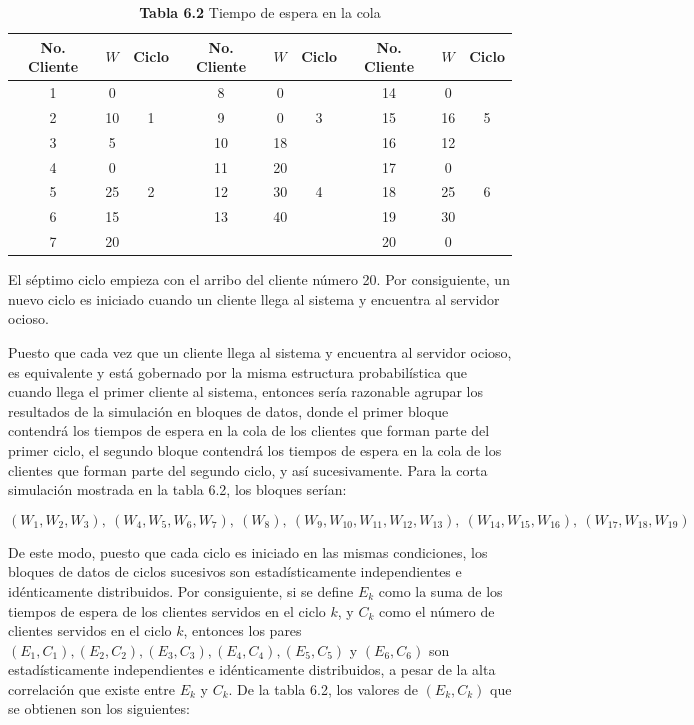 \documentclass[11pt,letterpaper]{report}
\begin{document}
\begin{table}[H]
\centering
\caption*{\textbf{Tabla 6.2} Tiempo de espera en la cola}
\begin{tabular}{ccc ccc ccc}
\toprule
No. Cliente & $W$ & Ciclo & No. Cliente & $W$ & Ciclo & No. Cliente & $W$ & Ciclo \\
\midrule
1 & 0 & & 8 & 0 & & 14 & 0 & \\
2 & 10 & 1 & 9 & 0 & 3 & 15 & 16 & 5 \\
3 & 5 & & 10 & 18 & & 16 & 12 & \\
4 & 0 & & 11 & 20 & & 17 & 0 & \\
5 & 25 & 2 & 12 & 30 & 4 & 18 & 25 & 6 \\
6 & 15 & & 13 & 40 & & 19 & 30 & \\
7 & 20 & & & & & 20 & 0 & \\
\bottomrule
\end{tabular}
\end{table}

El séptimo ciclo empieza con el arribo del cliente número 20. Por
consiguiente, un nuevo ciclo es iniciado cuando un cliente llega al
sistema y encuentra al servidor ocioso.

Puesto que cada vez que un cliente llega al sistema y encuentra al
servidor ocioso, es equivalente y está gobernado por la misma estructura
probabilística que cuando llega el primer cliente al sistema, entonces
sería razonable agrupar los resultados de la simulación en bloques de
datos, donde el primer bloque contendrá los tiempos de espera en la
cola de los clientes que forman parte del primer ciclo, el segundo
bloque contendrá los tiempos de espera en la cola de los clientes que
forman parte del segundo ciclo, y así sucesivamente. Para la corta
simulación mostrada en la tabla 6.2, los bloques serían:

\[
(W_1,W_2,W_3),\ (W_4,W_5,W_6,W_7),\ (W_8),\ (W_9,W_{10},W_{11},W_{12},W_{13}),\ (W_{14},W_{15},W_{16}),\ (W_{17},W_{18},W_{19})
\]

De este modo, puesto que cada ciclo es iniciado en las mismas
condiciones, los bloques de datos de ciclos sucesivos son
estadísticamente independientes e idénticamente distribuidos. Por
consiguiente, si se define $E_k$ como la suma de los tiempos de espera
de los clientes servidos en el ciclo $k$, y $C_k$ como el número de
clientes servidos en el ciclo $k$, entonces los pares $(E_1,C_1),
(E_2,C_2), (E_3,C_3), (E_4,C_4), (E_5,C_5)$ y $(E_6,C_6)$ son
estadísticamente independientes e idénticamente distribuidos, a pesar de
la alta correlación que existe entre $E_k$ y $C_k$. De la tabla 6.2, los
valores de $(E_k,C_k)$ que se obtienen son los siguientes:
\end{document}

